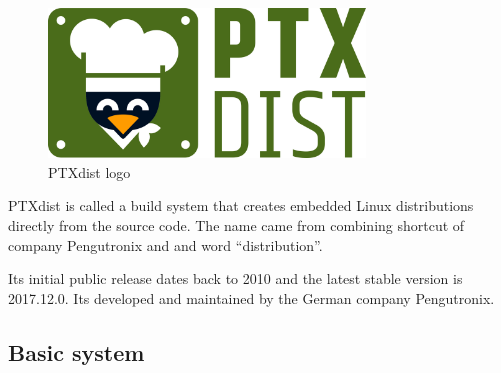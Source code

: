 \documentclass[printmode]{mgr}
\begin{document}
\begin{figure}[htbp]
  \centering
    \includegraphics[width=0.75\textwidth]{ptxdist-logo.png}
    \caption{PTXdist logo}
  \label{fig:ptxdist-logo}
\end{figure}

PTXdist is called a build system that creates embedded Linux distributions directly from the source code. The name came from combining shortcut of company Pengutronix and and word ``distribution''.

Its initial public release dates back to 2010 and the latest stable version is 2017.12.0. Its developed and maintained by the German company Pengutronix.



\subsection*{Basic system}







\end{document}

